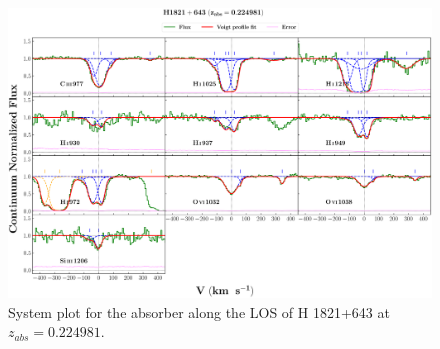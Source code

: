   \begin{landscape}
  
  \begin{figure}
      \centering
      \vspace{-20mm}
      \hspace*{-35mm}
      \includegraphics[width=1.25\linewidth]{System-Plots/H1821+643_z=0.224981_sys_plot.png}
      \caption{System plot for the absorber along the LOS of H 1821+643 at $z_{abs} = 0.224981$. }
  \end{figure}
  
  \end{landscape}
  
